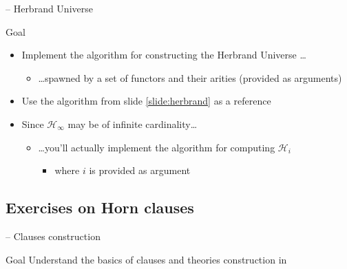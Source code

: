 \documentclass[presentation]{beamer}\mode<presentation>{\usetheme{AMSBolognaFC}}
\begin{document}
\begin{frame}{\currentExercise{} -- Herbrand Universe}
    \begin{block}{Goal}
        \begin{itemize}
            \item Implement the algorithm for constructing the Herbrand Universe \ldots
            \begin{itemize}
                \item \ldots spawned by a set of functors and their arities (provided as arguments)
            \end{itemize}

            \item Use the algorithm from slide \ref{slide:herbrand} as a reference
            
            \item Since $\mathcal{H}_\infty$ may be of infinite cardinality\ldots
            \begin{itemize}
                \item \ldots you'll actually implement the algorithm for computing $\mathcal{H}_i$
                \begin{itemize}
                    \item where $i$ is provided as argument
                \end{itemize}
            \end{itemize}
        \end{itemize}
    \end{block}
\end{frame}

\subsection{Exercises on Horn clauses}

\startExercise{}

\begin{frame}{\currentExercise{} -- Clauses construction}

    \begin{block}{Goal}
        Understand the basics of clauses and theories construction in \twopkt{}
    \end{block}
    
\end{frame}

\startExercise{}
\end{document}
